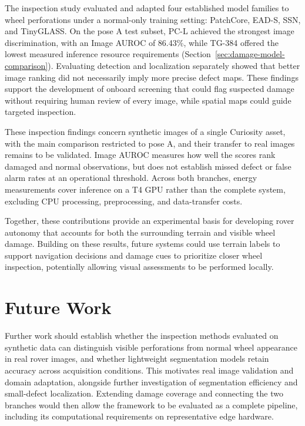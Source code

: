 The inspection study evaluated and adapted four established model families to wheel perforations under a normal-only training setting: PatchCore, EAD-S, SSN, and TinyGLASS\@. On the pose A test subset, PC-L achieved the strongest image discrimination, with an Image AUROC of 86.43\%, while TG-384 offered the lowest measured inference resource requirements (Section~\ref{sec:damage-model-comparison}). Evaluating detection and localization separately showed that better image ranking did not necessarily imply more precise defect maps. These findings support the development of onboard screening that could flag suspected damage without requiring human review of every image, while spatial maps could guide targeted inspection.

These inspection findings concern synthetic images of a single Curiosity asset, with the main comparison restricted to pose A, and their transfer to real images remains to be validated. Image AUROC measures how well the scores rank damaged and normal observations, but does not establish missed defect or false alarm rates at an operational threshold. Across both branches, energy measurements cover inference on a T4 GPU rather than the complete system, excluding CPU processing, preprocessing, and data-transfer costs.

Together, these contributions provide an experimental basis for developing rover autonomy that accounts for both the surrounding terrain and visible wheel damage. Building on these results, future systems could use terrain labels to support navigation decisions and damage cues to prioritize closer wheel inspection, potentially allowing visual assessments to be performed locally.

\section{Future Work}
\label{sec:future-work}

Further work should establish whether the inspection methods evaluated on synthetic data can distinguish visible perforations from normal wheel appearance in real rover images, and whether lightweight segmentation models retain accuracy across acquisition conditions. This motivates real image validation and domain adaptation, alongside further investigation of segmentation efficiency and small-defect localization. Extending damage coverage and connecting the two branches would then allow the framework to be evaluated as a complete pipeline, including its computational requirements on representative edge hardware.

